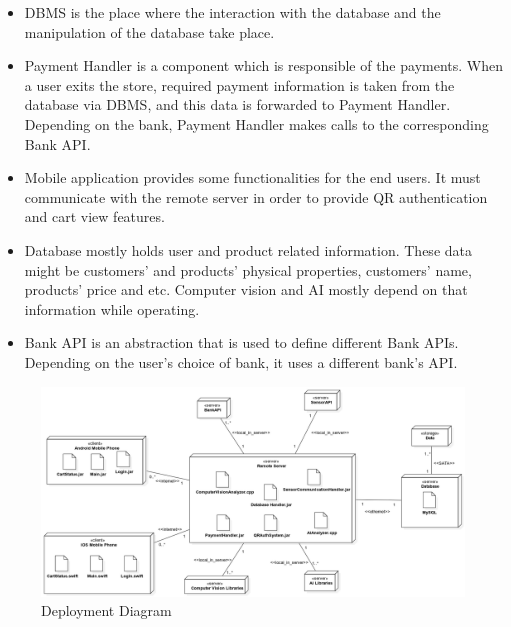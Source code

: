 \documentclass[11pt]{article}
\begin{document}
\begin{itemize}
        \item DBMS is the place where the interaction with the database and the manipulation of the database take place. 
        
        \item Payment Handler is a component which is responsible of the payments. When a user exits the store, required payment information is taken from the 
        database via DBMS, and this data is forwarded to Payment Handler. Depending on the bank, Payment Handler makes calls to the corresponding Bank API. 
        
        \item Mobile application provides some functionalities for the end users. It must communicate with the remote server in order to provide QR authentication and 
        cart view features.
        
        \item Database mostly holds user and product related information. These data might be customers' and products' physical properties, customers' name, products' 
        price and etc. Computer vision and AI mostly depend on that information while operating.
        
        \item Bank API is an abstraction that is used to define different Bank APIs. Depending on the user's choice of bank, it uses a different bank's API.
    \end{itemize}

    \begin{center}
        \begin{figure}[H]
            \includegraphics[width=\linewidth]{Images/DeploymentDiagram.png}
            \caption{Deployment Diagram}
            \label{deployDia}
        \end{figure}
    \end{center}
    
\end{document}

